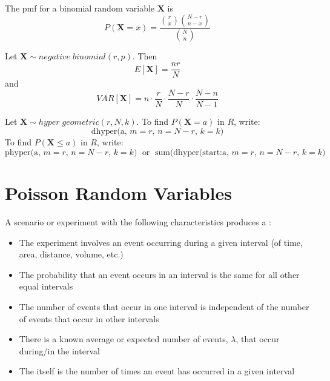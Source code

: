 \documentclass[12pt]{report}
\begin{document}
\begin{defn}{}{}
    The pmf for a binomial random variable $\mathbf{X}$ is \begin{equation*}
        P(\mathbf{X} = x) = \frac{\binom{r}{x}\binom{N-r}{n-x}}{\binom{N}{n}}
    \end{equation*}
\end{defn}

\begin{defn}{}{}
    Let $\mathbf{X}\sim negative\;binomial(r,p)$. Then \begin{equation*}
        E[\mathbf{X}] = \frac{nr}{N}
    \end{equation*}
    and
    \begin{equation*}
        VAR[\mathbf{X}] = n\cdot\frac{r}{N}\cdot\frac{N-r}{N}\cdot\frac{N-n}{N-1}
    \end{equation*}
\end{defn}



\begin{defn}{}{}
    Let $\mathbf{X}\sim hyper\;geometric(r,N,k)$. To find $P(\mathbf{X} = a)$ in $R$, write: \begin{equation*}
        \text{dhyper(a, $m = r$, $n = N-r$, $k = k$)}
    \end{equation*}
    To find $P(\mathbf{X} \leq a)$ in $R$, write: \begin{equation*}
        \text{phyper(a, $m = r$, $n = N-r$, $k=k$)}\;\text{ or }\;\text{sum(dhyper(start:a, $m = r$, $n = N-r$, $k = k$)}
    \end{equation*}
\end{defn}

\section{Poisson Random Variables}

\begin{defn}{}{}
    A scenario or experiment with the following characteristics produces a : \begin{itemize}
        \item The experiment involves an event occurring during a given interval (of time, area, distance, volume, etc.)
        \item The probability that an event occurs in an interval is the same for all other equal intervals
        \item The number of events that occur in one interval is independent of the number of events that occur in other intervals
        \item There is a known average or expected number of events, $\lambda$, that occur during/in the interval
        \item The  itself is the number of times an event has occurred in a given interval
    \end{itemize}
\end{defn}
\end{document}
